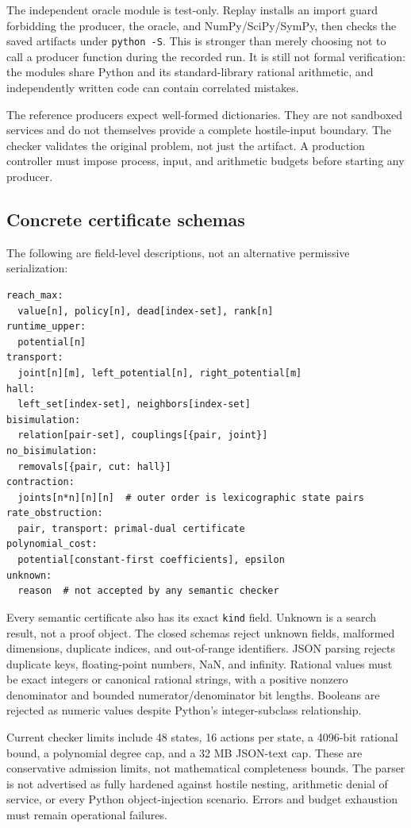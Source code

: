\documentclass[11pt,letterpaper]{article}
\theoremstyle{definition}\newtheorem{definition}[theorem]{Definition}
\theoremstyle{remark}\newtheorem{remark}[theorem]{Remark}
\newcommand{\code}[1]{\texttt{#1}}
\begin{document}
The independent oracle module is test-only. Replay installs an import guard forbidding the producer, the oracle, and NumPy/SciPy/SymPy, then checks the saved artifacts under \code{python -S}. This is stronger than merely choosing not to call a producer function during the recorded run. It is still not formal verification: the modules share Python and its standard-library rational arithmetic, and independently written code can contain correlated mistakes.

The reference producers expect well-formed dictionaries. They are not sandboxed services and do not themselves provide a complete hostile-input boundary. The checker validates the original problem, not just the artifact. A production controller must impose process, input, and arithmetic budgets before starting any producer.

\subsection{Concrete certificate schemas}
The following are field-level descriptions, not an alternative permissive serialization:
\begin{lstlisting}
reach_max:
  value[n], policy[n], dead[index-set], rank[n]
runtime_upper:
  potential[n]
transport:
  joint[n][m], left_potential[n], right_potential[m]
hall:
  left_set[index-set], neighbors[index-set]
bisimulation:
  relation[pair-set], couplings[{pair, joint}]
no_bisimulation:
  removals[{pair, cut: hall}]
contraction:
  joints[n*n][n][n]  # outer order is lexicographic state pairs
rate_obstruction:
  pair, transport: primal-dual certificate
polynomial_cost:
  potential[constant-first coefficients], epsilon
unknown:
  reason  # not accepted by any semantic checker
\end{lstlisting}
Every semantic certificate also has its exact \code{kind} field. Unknown is a search result, not a proof object. The closed schemas reject unknown fields, malformed dimensions, duplicate indices, and out-of-range identifiers. JSON parsing rejects duplicate keys, floating-point numbers, NaN, and infinity. Rational values must be exact integers or canonical rational strings, with a positive nonzero denominator and bounded numerator/denominator bit lengths. Booleans are rejected as numeric values despite Python's integer-subclass relationship.

Current checker limits include 48 states, 16 actions per state, a 4096-bit rational bound, a polynomial degree cap, and a 32 MB JSON-text cap. These are conservative admission limits, not mathematical completeness bounds. The parser is not advertised as fully hardened against hostile nesting, arithmetic denial of service, or every Python object-injection scenario. Errors and budget exhaustion must remain operational failures.
\end{document}
